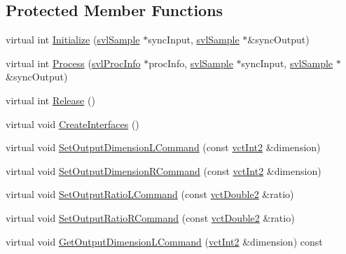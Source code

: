 \subsection*{Protected Member Functions}
\begin{DoxyCompactItemize}
\item 
virtual int \hyperlink{classsvl_filter_image_resizer_a32eef83eb1adb95d82d078e97f06aa42}{Initialize} (\hyperlink{classsvl_sample}{svl\-Sample} $\ast$sync\-Input, \hyperlink{classsvl_sample}{svl\-Sample} $\ast$\&sync\-Output)
\item 
virtual int \hyperlink{classsvl_filter_image_resizer_a50dac8050f4a32a277ce8a961cc63c76}{Process} (\hyperlink{structsvl_proc_info}{svl\-Proc\-Info} $\ast$proc\-Info, \hyperlink{classsvl_sample}{svl\-Sample} $\ast$sync\-Input, \hyperlink{classsvl_sample}{svl\-Sample} $\ast$\&sync\-Output)
\item 
virtual int \hyperlink{classsvl_filter_image_resizer_afb55d1d36affb2a11f0f999f5ccc04b1}{Release} ()
\item 
virtual void \hyperlink{classsvl_filter_image_resizer_a979807274e5816592114a4fffd0bb71b}{Create\-Interfaces} ()
\item 
virtual void \hyperlink{classsvl_filter_image_resizer_aacbed035fbd4880b683a6c18158ccf99}{Set\-Output\-Dimension\-L\-Command} (const \hyperlink{vct_fixed_size_vector_types_8h_add8c88eb6a432b15f14b866b9c35325f}{vct\-Int2} \&dimension)
\item 
virtual void \hyperlink{classsvl_filter_image_resizer_aada166d67fddd55ad5391d70721b6e9c}{Set\-Output\-Dimension\-R\-Command} (const \hyperlink{vct_fixed_size_vector_types_8h_add8c88eb6a432b15f14b866b9c35325f}{vct\-Int2} \&dimension)
\item 
virtual void \hyperlink{classsvl_filter_image_resizer_a716ae9051292140956e44549f8beb6c2}{Set\-Output\-Ratio\-L\-Command} (const \hyperlink{vct_fixed_size_vector_types_8h_afc0fdcc41cbe8b043747612501610812}{vct\-Double2} \&ratio)
\item 
virtual void \hyperlink{classsvl_filter_image_resizer_a18e26407cf94f45d99e401e131c5e6e7}{Set\-Output\-Ratio\-R\-Command} (const \hyperlink{vct_fixed_size_vector_types_8h_afc0fdcc41cbe8b043747612501610812}{vct\-Double2} \&ratio)
\item 
virtual void \hyperlink{classsvl_filter_image_resizer_ae730b292a9b54e996f65b0b8b09d7803}{Get\-Output\-Dimension\-L\-Command} (\hyperlink{vct_fixed_size_vector_types_8h_add8c88eb6a432b15f14b866b9c35325f}{vct\-Int2} \&dimension) const 
\item 

\end{DoxyCompactItemize}
